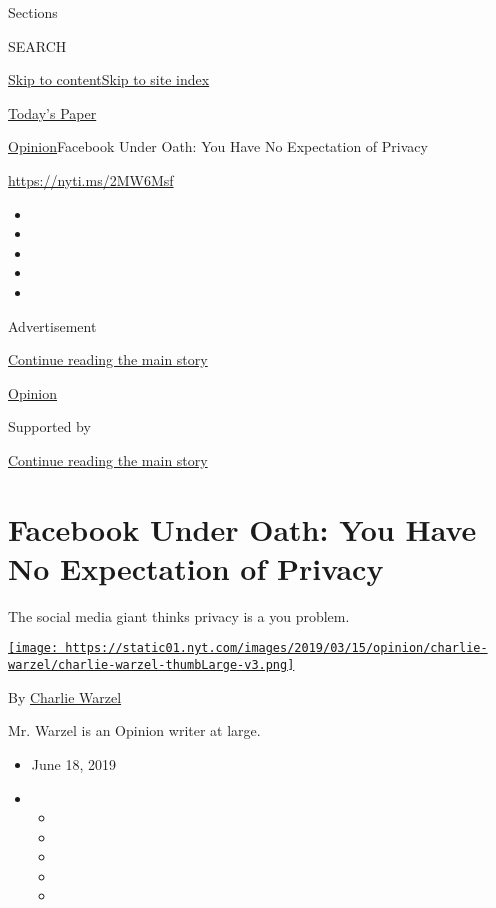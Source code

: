 Sections

SEARCH

\protect\hyperlink{site-content}{Skip to
content}\protect\hyperlink{site-index}{Skip to site index}

\href{https://myaccount.nytimes.com/auth/login?response_type=cookie\&client_id=vi}{}

\href{https://www.nytimes.com/section/todayspaper}{Today's Paper}

\href{/section/opinion}{Opinion}\textbar{}Facebook Under Oath: You Have
No Expectation of Privacy

\url{https://nyti.ms/2MW6Msf}

\begin{itemize}
\item
\item
\item
\item
\item
\end{itemize}

Advertisement

\protect\hyperlink{after-top}{Continue reading the main story}

\href{/section/opinion}{Opinion}

Supported by

\protect\hyperlink{after-sponsor}{Continue reading the main story}

\hypertarget{facebook-under-oath-you-have-no-expectation-of-privacy}{%
\section{Facebook Under Oath: You Have No Expectation of
Privacy}\label{facebook-under-oath-you-have-no-expectation-of-privacy}}

The social media giant thinks privacy is a you problem.

\href{https://www.nytimes.com/by/charlie-warzel}{\texttt{[image: https://static01.nyt.com/images/2019/03/15/opinion/charlie-warzel/charlie-warzel-thumbLarge-v3.png]}}

By \href{https://www.nytimes.com/by/charlie-warzel}{Charlie Warzel}

Mr. Warzel is an Opinion writer at large.

\begin{itemize}
\item
  June 18, 2019
\item
  \begin{itemize}
  \item
  \item
  \item
  \item
  \item
  \end{itemize}
\end{itemize}

